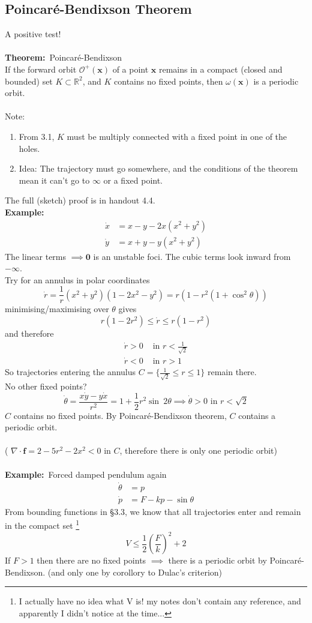 \documentclass{article}
\newcommand{\cO}{\mathcal{O}}                               %
\newcommand{\example}{\textbf{Example:}}                    %
\newcommand{\theorem}{\textbf{Theorem:}}                    %
\newcommand{\bx}{\bm{x}}                                    %
\begin{document}
\subsection{Poincar\'e-Bendixson Theorem}
A positive test!
\\
\\
\theorem\ Poincar\'e-Bendixson
\\
If the forward orbit $\cO^+(\bx)$ of a point $\bx$ remains in a compact 
(closed and bounded) set $K \subset \mathbb{R}^2$, and $K$ contains no 
fixed points, then $\omega(\bx)$ is a periodic orbit.
\\
\\
Note:
\begin{enumerate}[1.]
\item From 3.1, $K$ must be multiply connected with a fixed point in one
	of the holes.
\item Idea: The trajectory must go somewhere, and the conditions of the 
	theorem mean it can't go to $\infty$ or a fixed point.
\end{enumerate}
The full (sketch) proof is in handout 4.4.\\
\example\
\begin{align*}
\dot{x} &= x - y - 2x(x^2+y^2) \\
\dot{y} &= x+y -y(x^2+y^2)
\end{align*}
The linear terms $\implies \bm{0}$ is an unstable foci. The cubic terms
look inward from $-\infty$.
\\
Try for an annulus in polar coordinates
\[ \dot{r} = \frac{1}{r}(x^2+y^2)(1-2x^2-y^2) = r(1-r^2(1+\cos^2 \theta)) \]
minimising/maximising over $\theta$ gives
\[ r(1-2r^2) \leq \dot{r} \leq r(1-r^2) \]
and therefore
\begin{align*}
\dot{r}>0 &\mbox{ in } r < \frac{1}{\sqrt{2}} \\
\dot{r}<0 &\mbox{ in } r > 1
\end{align*}
So trajectories entering the annulus $C = \{ \frac{1}{\sqrt{2}} \leq r \leq 1 \}$
remain there.
\\
No other fixed points?
\[\dot{\theta} = \frac{x \dot{y} - y \dot{x}}{r^2} = 1 + \frac{1}{2}r^2 \sin \
2\theta \implies \dot{\theta} > 0 \mbox{ in } r < \sqrt{2} \]
$C$ contains no fixed points. By Poincar\'e-Bendixson theorem, $C$ contains a
periodic orbit.
\\
\\
( $\nabla \cdot \bm{f} = 2 - 5r^2 -2x^2 <0$ in $C$, therefore there is
only one periodic orbit)
\\
\\
\example\ Forced damped pendulum again
\begin{align*}
\dot{\theta} &= p \\
\dot{p}      &= F - kp - \sin \theta
\end{align*}
From bounding functions in \S 3.3, we know that all trajectories enter
and remain in the compact set
\footnote{I actually have no idea what V is! my notes don't contain any 
reference, and apparently I didn't notice at the time...}
\[ V \leq \frac{1}{2} \left(\frac{F}{k} \right)^2 +2\]
If $F>1$ then there are no fixed points $\implies$ there is a periodic
orbit by Poincar\'e-Bendixson. (and only one by corollory to Dulac's
criterion)
\\
\end{document}
